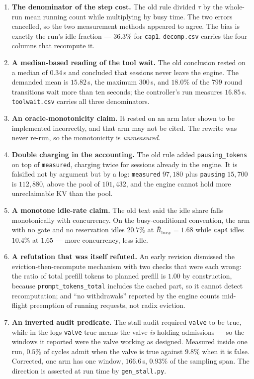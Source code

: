 \documentclass[10pt]{article}
\begin{document}
\begin{enumerate}
\item \textbf{The denominator of the step cost.} The old rule divided $\tau$ by
the whole-run mean running count while multiplying by busy time. The two errors
cancelled, so the two measurement methods appeared to agree. The bias is exactly
the run's idle fraction --- $36.3\%$ for \texttt{cap1}. \texttt{decomp.csv}
carries the four columns that recompute it.
\item \textbf{A median-based reading of the tool wait.} The old conclusion rested
on a median of $0.34$\,s and concluded that sessions never leave the engine. The
demanded mean is $15.82$\,s, the maximum $300$\,s, and $18.0\%$ of the $799$
round transitions wait more than ten seconds; the controller's run measures
$16.85$\,s. \texttt{toolwait.csv} carries all three denominators.
\item \textbf{An oracle-monotonicity claim.} It rested on an arm later shown to be
implemented incorrectly, and that arm may not be cited. The rewrite was never
re-run, so the monotonicity is \emph{unmeasured}.
\item \textbf{Double charging in the accounting.} The old rule added
\texttt{pausing\_tokens} on top of \texttt{measured}, charging twice for sessions
already in the engine. It is falsified not by argument but by a log:
\texttt{measured} $97{,}180$ plus \texttt{pausing} $15{,}700$ is $112{,}880$,
above the pool of $101{,}432$, and the engine cannot hold more unreclaimable KV
than the pool.
\item \textbf{A monotone idle-rate claim.} The old text said the idle share falls
monotonically with concurrency. On the busy-conditional convention, the arm with
no gate and no reservation idles $20.7\%$ at $\overline{R}_{\mathrm{busy}}=1.68$
while \texttt{cap4} idles $10.4\%$ at $1.65$ --- more concurrency, less idle.
\item \textbf{A refutation that was itself refuted.} An early revision dismissed
the eviction-then-recompute mechanism with two checks that were each wrong: the
ratio of total prefill tokens to planned prefill is $1.00$ by construction,
because \texttt{prompt\_tokens\_total} includes the cached part, so it cannot
detect recomputation; and ``no withdrawals'' reported by the engine counts
mid-flight preemption of running requests, not radix eviction.
\item \textbf{An inverted audit predicate.} The stall audit required
\texttt{valve} to be true, while in the logs \texttt{valve} true means the valve
\emph{is} holding admissions --- so the windows it reported were the valve
working as designed. Measured inside one run, $0.5\%$ of cycles admit when the
valve is true against $9.8\%$ when it is false. Corrected, one arm has one
window, $166.6$\,s, $0.93\%$ of the sampling span. The direction is asserted at
run time by \texttt{gen\_stall.py}.
\end{enumerate}
\end{document}
